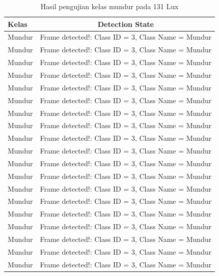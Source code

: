 \begin{longtable}{|l|c|}
  \caption{Hasil pengujian kelas mundur pada 131 Lux}
  \label{tb:lux131mundur} \\
  \hline
  \rowcolor[HTML]{C0C0C0} 
  \textbf{Kelas} & \textbf{Detection State}                           \\ \hline
  Mundur         & Frame detected!: Class ID = 3, Class Name = Mundur \\ \hline
  Mundur         & Frame detected!: Class ID = 3, Class Name = Mundur \\ \hline
  Mundur         & Frame detected!: Class ID = 3, Class Name = Mundur \\ \hline
  Mundur         & Frame detected!: Class ID = 3, Class Name = Mundur \\ \hline
  Mundur         & Frame detected!: Class ID = 3, Class Name = Mundur \\ \hline
  Mundur         & Frame detected!: Class ID = 3, Class Name = Mundur \\ \hline
  Mundur        & Frame detected!: Class ID = 3, Class Name = Mundur   \\ \hline
  Mundur         & Frame detected!: Class ID = 3, Class Name = Mundur \\ \hline
  Mundur         & Frame detected!: Class ID = 3, Class Name = Mundur \\ \hline
  Mundur         & Frame detected!: Class ID = 3, Class Name = Mundur \\ \hline
  Mundur         & Frame detected!: Class ID = 3, Class Name = Mundur \\ \hline
  Mundur         & Frame detected!: Class ID = 3, Class Name = Mundur \\ \hline
  Mundur         & Frame detected!: Class ID = 3, Class Name = Mundur \\ \hline
  Mundur         & Frame detected!: Class ID = 3, Class Name = Mundur \\ \hline
  Mundur         & Frame detected!: Class ID = 3, Class Name = Mundur \\ \hline
  Mundur         & Frame detected!: Class ID = 3, Class Name = Mundur \\ \hline
  Mundur         & Frame detected!: Class ID = 3, Class Name = Mundur \\ \hline
  Mundur        & Frame detected!: Class ID = 3, Class Name = Mundur   \\ \hline
  Mundur         & Frame detected!: Class ID = 3, Class Name = Mundur \\ \hline

\end{longtable}
